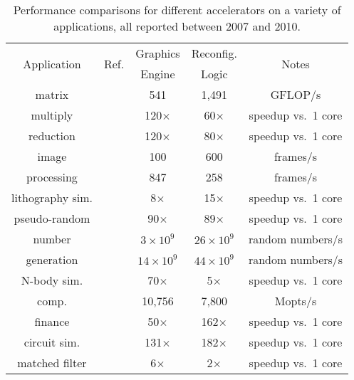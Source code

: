 \begin{table}[ht]
\centering
\caption{Performance comparisons for different accelerators on a variety of applications, all reported between 2007 and 2010.}
\label{tbl:compare}
\vspace{0.1in} 
\begin{tabular}{c | c | c | c | c }
\multirow{2}{*}{Application} & \multirow{2}{*}{Ref.} & Graphics & Reconfig. & \multirow{2}{*}{Notes} \\
  &   & Engine & Logic &  \\ \hline
matrix & \cite{cmhm10} & 541 & 1,491 & GFLOP/s\\
multiply  & \cite{jpbc10} & 120$\times$ & 60$\times$ & speedup vs.~1 core\\ \hline
reduction  & \cite{jpbc10} & 120$\times$ & 80$\times$ & speedup vs.~1 core\\ \hline
image & \cite{amy09} & 100 & 600 & frames/s \\
processing & \cite{bnw+10} & 847 & 258 & frames/s \\ \hline
lithography sim. & \cite{cz09} & 8$\times$ & 15$\times$ & speedup vs.~1 core\\ \hline
pseudo-random & \cite{jpbc10} & 90$\times$ & 89$\times$ & speedup vs.~1 core\\ 
number  & \cite{tb09} & $3\times10^9$ & $26\times10^9$ & random numbers/s\\
generation & \cite{thl09} & $14\times10^9$ & $44\times10^9$ & random numbers/s\\ \hline
N-body sim.  & \cite{jpbc10} & 70$\times$ & 5$\times$ & speedup vs.~1 core\\ \hline
comp.& \cite{cmhm10} & 10,756 & 7,800 & Mopts/s\\
finance  & \cite{tb10} & 50$\times$ & 162$\times$ & speedup vs.~1 core\\ \hline
circuit sim. & \cite{kd09} & 131$\times$ & 182$\times$ & speedup vs.~1 core\\ \hline
matched filter  & \cite{bgt07} & 6$\times$ & 2$\times$ & speedup vs.~1 core\\
\end{tabular}
\end{table}

